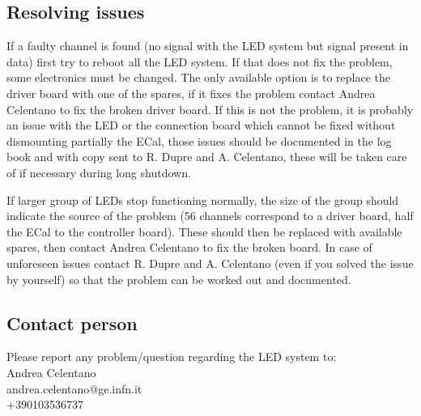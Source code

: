 \documentclass[12pt]{article}
\begin{document}
      \subsection{Resolving issues}

      If a faulty channel is found (no signal with the LED system but signal present in data) first try to reboot all the LED system. If that does not fix the problem, some electronics must be changed. The only available option is to replace the driver board with one of the spares, if it fixes the problem contact Andrea Celentano to fix the broken driver board. If this is not the problem, it is probably an issue with the LED or the connection board which cannot be fixed without dismounting partially the ECal, those issues should be documented in the log book and with copy sent to R. Dupre and A. Celentano, these will be taken care of if necessary during long shutdown.

     If larger group of LEDs stop functioning normally, the size of the group should indicate the source of the problem (56 channels correspond to a driver board, half the ECal to the controller board). These should then be replaced with available spares, then contact Andrea Celentano to fix the broken board. In case of unforeseen issues contact R. Dupre and A. Celentano (even if you solved the issue by yourself) so that the problem can be worked out and documented.

      \subsection{Contact person}

      Please report any problem/question regarding the LED system to:\\
\newline
Andrea Celentano\\
andrea.celentano@ge.infn.it\\
+390103536737
\end{document}
